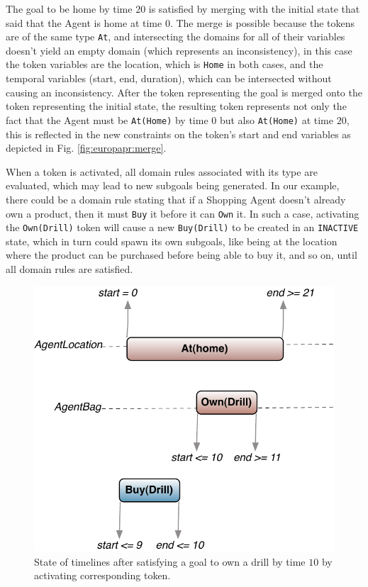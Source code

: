 \begin{description}
The goal to be home by time $20$ is satisfied by merging with the
initial state that said that the Agent is home at time $0$.  The merge
is possible because the tokens are of the same type \texttt{At}, and
intersecting the domains for all of their variables doesn't yield an
empty domain (which represents an inconsistency), in this case the
token variables are the location, which is \texttt{Home} in both
cases, and the temporal variables (start, end, duration), which can be
intersected without causing an inconsistency. After the token
representing the goal is merged onto the token representing the
initial state, the resulting token represents not only the fact that
the Agent must be \texttt{At(Home)} by time 0 but also
\texttt{At(Home)} at time $20$, this is reflected in the new
constraints on the token's start and end variables as depicted in
Fig. \ref{fig:europapr:merge}.

When a token is activated, all domain rules associated with its type
are evaluated, which may lead to new subgoals being generated. In our
example, there could be a domain rule stating that if a Shopping Agent
doesn't already own a product, then it must \texttt{Buy} it before it
can \texttt{Own} it. In such a case, activating the
\texttt{Own(Drill)} token will cause a new \texttt{Buy(Drill)} to be
created in an \texttt{INACTIVE} state, which in turn could spawn its
own subgoals, like being at the location where the product can be
purchased before being able to buy it, and so on, until all domain
rules are satisfied.

\begin{figure} \centering
  \includegraphics[scale=0.4]{figs/europa-pr-activate.pdf}
  \caption{\small State of timelines after satisfying a goal to own a
    drill by time $10$ by activating corresponding token.}
\label{fig:europapr:activate}
\end{figure}


\end{description}
